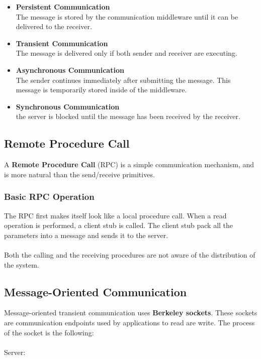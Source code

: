 \documentclass{article}
\begin{document}
\begin{itemize}
	\item \textbf{Persistent Communication} \\
	The message is stored by the communication middleware until it can be delivered to the receiver.
	
	\item \textbf{Transient Communication} \\
	The message is delivered only if both sender and receiver are executing.
	
	\item \textbf{Asynchronous Communication} \\
	The sender continues immediately after submitting the message. This message is temporarily stored inside of the middleware.
	
	\item \textbf{Synchronous Communication} \\
	the server is blocked until the message has been received by the receiver.
\end{itemize}

\subsection{Remote Procedure Call}
A \textbf{Remote Procedure Call} (RPC) is a simple communication mechanism, and is more natural than the send/receive primitives.

\subsubsection{Basic RPC Operation}
The RPC first makes itself look like a local procedure call. When a read operation is performed, a client stub is called. The client stub pack all the parameters into a message and sends it to the server. \\ \\
Both the calling and the receiving procedures are not aware of the distribution of the system.

\subsection{Message-Oriented Communication}
Message-oriented transient communication uses \textbf{Berkeley sockets}. These sockets are communication endpoints used by applications to read are write. The process of the socket is the following: \\ \\
Server:
\end{document}
